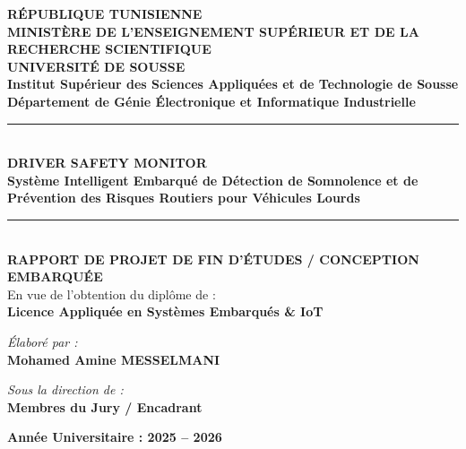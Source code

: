 \documentclass[11pt,a4paper]{article}
\begin{document}
\begin{titlepage}
    \begin{center}
        {\large \textbf{RÉPUBLIQUE TUNISIENNE}}\\[0.15cm]
        {\large \textbf{MINISTÈRE DE L'ENSEIGNEMENT SUPÉRIEUR ET DE LA RECHERCHE SCIENTIFIQUE}}\\[0.15cm]
        {\large \textbf{UNIVERSITÉ DE SOUSSE}}\\[0.3cm]
        {\Large \textbf{Institut Supérieur des Sciences Appliquées et de Technologie de Sousse}}\\[0.2cm]
        {\small \textbf{Département de Génie Électronique et Informatique Industrielle}}\\[0.8cm]

        \vspace{0.4cm}
        \rule{\linewidth}{1.2pt}\\[0.4cm]
        {\huge \bfseries \color{brandblue} DRIVER SAFETY MONITOR}\\[0.35cm]
        {\Large \bfseries Système Intelligent Embarqué de Détection de Somnolence et de Prévention des Risques Routiers pour Véhicules Lourds}\\[0.4cm]
        \rule{\linewidth}{1.2pt}\\[0.8cm]

        {\large \textbf{RAPPORT DE PROJET DE FIN D'ÉTUDES / CONCEPTION EMBARQUÉE}}\\[0.3cm]
        {\normalsize En vue de l'obtention du diplôme de :}\\[0.2cm]
        {\large \textbf{Licence Appliquée en Systèmes Embarqués \& IoT}}\\[1.2cm]

        \begin{minipage}{0.48\textwidth}
            \begin{flushleft} \large
                \emph{Élaboré par :}\\
                \textbf{Mohamed Amine MESSELMANI}
            \end{flushleft}
        \end{minipage}
        \hfill
        \begin{minipage}{0.48\textwidth}
            \begin{flushright} \large
                \emph{Sous la direction de :}\\
                \textbf{Membres du Jury / Encadrant}
            \end{flushright}
        \end{minipage}

        \vfill
        {\large \textbf{Année Universitaire : 2025 -- 2026}}
    \end{center}
\end{titlepage}
\end{document}

